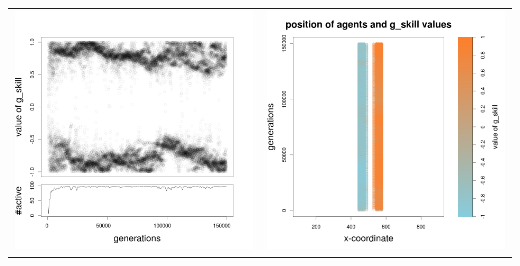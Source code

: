 \documentclass[a4paper,10pt]{article}
\begin{document}
\begin{table}[H]
\begin{tabular}{cc}
 \includegraphics[width=\imgSize]{../images/5StaticEnv/Gplot62_staticEnv4}&\includegraphics[width=\imgSize]{../images/5StaticEnv/Gplot62Static_staticEnv4}\\

\end{tabular}
\end{table}
\end{document}
